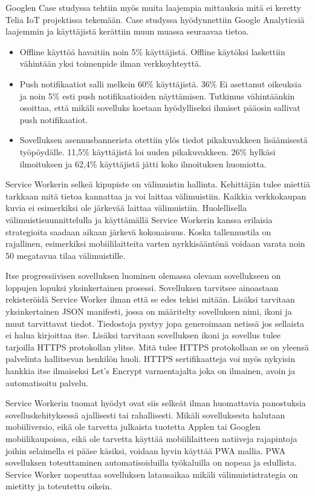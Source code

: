 \documentclass{tktltiki}
\begin{document}
Googlen Case studyssa tehtiin myös muita laajempia mittauksia mitä ei keretty Telia IoT projektissa tekemään. Case studyssa hyödynnettiin Google Analyticsiä laajemmin ja käyttäjistä kerättiin muun muassa seuraavaa tietoa. 

\begin{itemize}
  \item Offline käyttöä havaitiin noin 5\% käyttäjistä. Offline käytöksi laskettiin vähintään yksi toimenpide ilman verkkoyhteyttä.
  \item Push notifikaatiot salli melkein 60\% käyttäjistä. 36\% Ei asettanut oikeuksia ja noin 5\% esti push notifikaatioiden näyttämisen. Tutkimus vähintäänkin osoittaa, että mikäli sovelluks koetaan hyödylliseksi ihmiset pääosin sallivat push notifikaatiot. 
  \item Sovelluksen asennusbannerista otettiin ylös tiedot pikakuvakkeen lisäämisestä työpöydälle. 11,5\% käyttäjistä loi uuden pikakuvakkeen. 26\% hylkäsi ilmoituksen ja 62,4\% käyttäjistä jätti koko ilmoituksen huomiotta.
\end{itemize}
 
Service Workerin selkeä kipupiste on välimuistin hallinta. Kehittäjän tulee miettiä tarkkaan mitä tietoa kannattaa ja voi laittaa välimuistiin. Kaikkia verkkokaupan kuvia ei esimerkiksi ole järkevää laittaa välimuistiin. Huolellisella välimuistisuunnittelulla ja käyttämällä Service Workerin kanssa erilaisia strategioita saadaan aikaan järkevä kokonaisuus. Koska tallennustila on rajallinen, esimerkiksi mobiililaitteita varten nyrkkisääntönä voidaan varata noin 50 megatavua tilaa välimuistille. \cite{Love}

Itse progressiivisen sovelluksen luominen olemassa olevaan sovellukseen on loppujen lopuksi yksinkertainen prosessi. Sovelluksen tarvitsee ainoastaan rekisteröidä Service Worker ilman että se edes tekisi mitään. Lisäksi tarvitaan yksinkertainen JSON manifesti, jossa on määritelty sovelluksen nimi, ikoni ja muut tarvittavat tiedot. Tiedostoja pystyy jopa generoimaan netissä jos sellaista ei halua kirjoittaa itse. Lisäksi tarvitaan sovelluksen ikoni ja sovellus tulee tarjoilla HTTPS protokollan ylitse. Mitä tulee HTTPS protokollaan se on yleensä palvelinta hallitsevan henkilön huoli. HTTPS sertifikaatteja voi myös nykyisin hankkia itse ilmaiseksi Let's Encrypt varmentajalta joka on ilmainen, avoin ja automatisoitu palvelu.

Service Workerin tuomat hyödyt ovat siis selkeät ilman huomattavia panostuksia sovelluskehityksessä ajallisesti tai rahallisesti. Mikäli sovelluksesta halutaan  mobiiliversio, eikä ole tarvetta julkaista tuotetta Applen tai Googlen mobiilikaupoissa, eikä ole tarvetta käyttää mobiililaitteen natiiveja rajapintoja joihin selaimella ei pääse käsiksi, voidaan hyvin käyttää PWA mallia. PWA sovelluksen toteuttaminen automatisoiduilla työkaluilla on nopeaa ja edullista. Service Worker nopeuttaa sovelluksen latausaikaa mikäli välimuististrategia on mietitty ja toteutettu oikein. 
\end{document}
